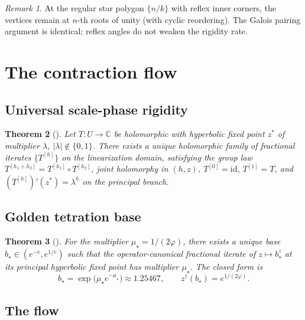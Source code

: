\documentclass[11pt,reqno]{amsart}
\theoremstyle{plain}
\newtheorem{theorem}{Theorem}[section]
\theoremstyle{definition}
\theoremstyle{remark}
\newtheorem{remark}[theorem]{Remark}
\newcommand{\Complex}{\mathbb{C}}
\newcommand{\bstar}{b_{\star}}
\newcommand{\mustar}{\mu_{\star}}
\begin{document}
\begin{remark}\label{rem:reflex-rigidity}
At the regular star polygon $\{n/k\}$ with reflex inner corners, the vertices remain at $n$-th roots of unity (with cyclic reordering). The Galois pairing argument is identical; reflex angles do not weaken the rigidity rate.
\end{remark}

\section{The contraction flow}\label{sec:contraction-flow}

\subsection{Universal scale-phase rigidity}\label{ss:scale-phase-master}

\begin{theorem}[{\cite[Theorem 9.15]{GulatiTetration}}]\label{thm:scale-phase}
Let $T \colon U \to \Complex$ be holomorphic with hyperbolic fixed point $z^*$ of multiplier $\lambda$, $|\lambda| \notin \{0, 1\}$. There exists a unique holomorphic family of fractional iterates $\{T^{[h]}\}$ on the linearization domain, satisfying the group law $T^{[h_1+h_2]} = T^{[h_1]} \circ T^{[h_2]}$, joint holomorphy in $(h, z)$, $T^{[0]} = \mathrm{id}$, $T^{[1]} = T$, and $(T^{[h]})'(z^*) = \lambda^h$ on the principal branch.
\end{theorem}

\subsection{Golden tetration base}\label{ss:golden-base-master}

\begin{theorem}[{\cite[Theorem 9.38]{GulatiTetration}}]\label{thm:bstar-master}
For the multiplier $\mustar = 1/(2\varphi)$, there exists a unique base $\bstar \in (e^{-e}, e^{1/e})$ such that the operator-canonical fractional iterate of $z \mapsto \bstar^z$ at its principal hyperbolic fixed point has multiplier $\mustar$. The closed form is
\[
\bstar = \exp\bigl(\mustar e^{-\mustar}\bigr) \approx 1.25467, \qquad z^\dagger(\bstar) = e^{1/(2\varphi)}.
\]
\end{theorem}

\subsection{The flow}\label{ss:flow-master}
\end{document}
